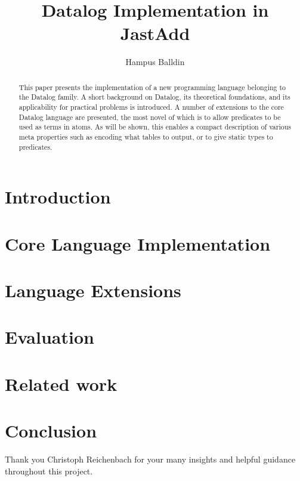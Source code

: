 \documentclass[sigplan,10pt]{acmart}
\begin{document}
\title[Short Title]{Datalog Implementation in JastAdd}         %



\author{Hampus Balldin}
\begin{abstract}
This paper presents the implementation of a new programming language belonging to the Datalog family.
A short background on Datalog, its theoretical foundations, and its applicability for practical problems is introduced.
A number of extensions to the core Datalog language are presented, the most novel of which is to allow predicates to be used as terms in atoms. As will be shown, this enables a compact description of various meta properties such as encoding what tables to output, or to give static types to predicates. 
\end{abstract}
\maketitle
\section{Introduction}

\section{Core Language Implementation}

\section{Language Extensions}

\vspace*{-15pt}
\section{Evaluation}

\vspace*{-5pt}
\section{Related work}

\section{Conclusion}

\begin{acks}
Thank you Christoph Reichenbach for your many insights and helpful guidance throughout this project.
\end{acks}

\clearpage

\end{document}
